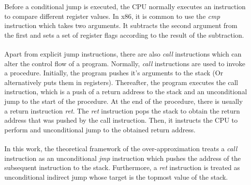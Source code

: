 \documentclass{kththesis}
\begin{document}
Before a conditional jump is executed, the CPU normally executes an instruction to compare different register values. In x86, it is common to use the \textit{cmp} instruction which takes two arguments. It subtracts the second argument from the first and sets a set of register flags according to the result of the subtraction. %
\\ \\
Apart from explicit jump instructions, there are also \textit{call} instructions which can alter the control flow of a program. Normally, \textit{call} instructions are used to invoke a procedure. Initially, the program pushes it's arguments to the stack (Or alternatively puts them in registers). Thereafter, the program executes the call instruction, which is a push of a return address to the stack and an unconditional jump to the start of the procedure. At the end of the procedure, there is usually a return instruction \textit{ret}. The \textit{ret} instruction pops the stack to obtain the return address that was pushed by the call instruction. Then, it instructs the CPU to perform and unconditional jump to the obtained return address. 
\\ \\ 
In this work, the theoretical framework of the over-approximation treats a \textit{call} instruction as an unconditional \textit{jmp} instruction which pushes the address of the subsequent instruction to the stack. Furthermore, a \textit{ret} instruction is treated as unconditional indirect jump whose target is the topmost value of the stack.
\end{document}
